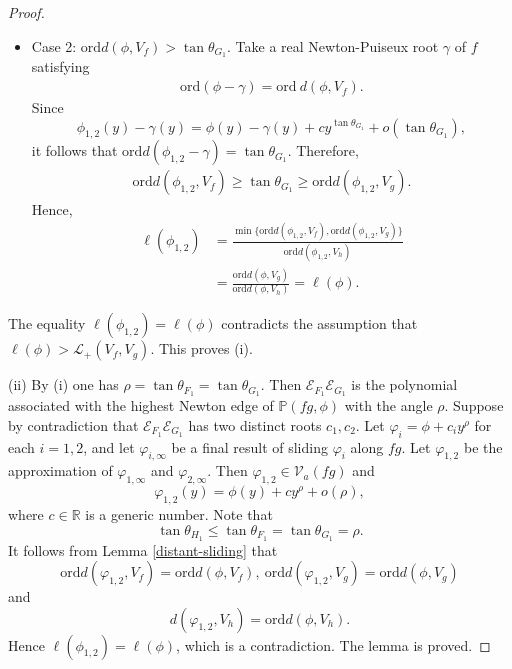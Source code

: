 \documentclass[10pt,a4paper]{amsart}
\begin{document}
\begin{proof}
\begin{itemize}
	\item Case 2: $\mathrm{ord}d(\phi, V_f) > \tan\theta_{G_1}$. Take a real Newton-Puiseux root $\gamma$ of $f$ satisfying
	\begin{align*}
		\mathrm{ord}(\phi - \gamma) = \mathrm{ord}\ d(\phi, V_f).
	\end{align*}
    Since
    $$ \phi_{1,2}(y)- \gamma(y) =\phi(y)-\gamma(y) + cy^{\tan\theta_{G_1}} + o(\tan\theta_{G_1}), $$
     it follows that $\mathrm{ord}d(\phi_{1,2} - \gamma) = \tan\theta_{G_1}$. Therefore,
	\begin{align}\label{order-with-Vf-tan}
		\mathrm{ord}d(\phi_{1,2}, V_f) \ge \tan\theta_{G_1}\ge \mathrm{ord}d(\phi_{1,2}, V_g).
	\end{align}
	Hence,
	  		\begin{align*}
			\ell(\phi_{1,2}) &= \frac{\min\{\mathrm{ord}d(\phi_{1,2},V_f), \mathrm{ord}d(\phi_{1,2},V_g)\}}{\mathrm{ord}d(\phi_{1,2},V_h)} \\
			&= \frac{ \mathrm{ord}d(\phi,V_g) }{\mathrm{ord}d(\phi,V_h)}  =\ell(\phi).
		\end{align*} 
		
\end{itemize}
The equality $\ell(\phi_{1,2})=\ell(\phi)$ contradicts the assumption that $\ell(\phi) > \mathscr{L}_+(V_f, V_g)$.  This proves (i).

(ii) By (i) one has $\rho=\tan \theta_{F_1} = \tan\theta_{G_1}$. Then $\mathcal{E}_{F_1}\mathcal{E}_{G_1}$ is the polynomial associated with the highest Newton edge of $\mathbb{P}(fg, \phi)$ with the angle $\rho$. Suppose by contradiction that $\mathcal{E}_{F_1}\mathcal{E}_{G_1}$ has two distinct roots $c_1,c_2$. Let $\varphi_i=\phi+c_i y^{\rho }$ for each $i=1,2$, and let $\varphi_{i,\infty}$ be a final result of sliding $\varphi_i$ along $fg$. Let $\varphi_{1,2}$ be the approximation of $\varphi_{1,\infty}$ and $\varphi_{2,\infty}$. Then $\varphi_{1,2}\in \mathcal{V}_a(fg)$ and 
	$$ \varphi_{1,2}(y) = \phi(y) + cy^{\rho} + o(\rho), $$ where $c \in \mathbb{R}$ is a generic number. Note that 
    $$\tan \theta_{H_1}\leq \tan \theta_{F_1}=\tan \theta_{G_1}=\rho.$$
    It follows from Lemma \ref{distant-sliding} that
    $$\mathrm{ord}d(\varphi_{1,2},V_f)=\mathrm{ord}d(\phi,V_f),\ \mathrm{ord}d(\varphi_{1,2},V_g)=\mathrm{ord}d(\phi,V_g) $$
	and
    $$d(\varphi_{1,2},V_h)=\mathrm{ord}d(\phi,V_h).$$
    Hence $\ell(\phi_{1,2})=\ell(\phi)$, which is a contradiction. The lemma is proved.    
\end{proof}
\end{document}
